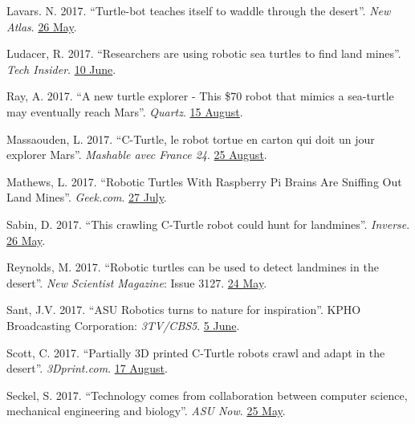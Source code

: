 \documentclass[12pt,a4paper]{article}
\begin{document}
\begin{description}
			\item Lavars. N. 2017. ``Turtle-bot teaches itself to waddle through the desert''. \textit{New Atlas}. \href{https://newatlas.com/turtle-robot-self-learning-waddle/49738/}{26 May}.
			\item Ludacer, R. 2017. ``Researchers are using robotic sea turtles to find land mines''. \textit{Tech Insider}. \href{https://www.facebook.com/techinsider/videos/787578874773804/}{10 June}.
			\item Ray, A. 2017. ``A new turtle explorer - This \$70 robot that mimics a sea-turtle may eventually reach Mars''. \textit{Quartz}. \href{https://qz.com/1053078/this-70-robot-that-mimics-a-sea-turtle-may-eventually-reach-mars/}{15 August}.
			\item Massaouden, L. 2017. ``C-Turtle, le robot tortue en carton qui doit un jour explorer Mars''. \textit{Mashable avec France 24}. \href{http://mashable.france24.com/videos/20170825-c-turtle-robot-tortue-carton-exploration-mars}{25 August}.
			\item Mathews, L. 2017. ``Robotic Turtles With Raspberry Pi Brains Are Sniffing Out Land Mines''. \textit{Geek.com}. \href{https://www.geek.com/tech/robotic-turtles-with-raspberry-pi-brains-are-sniffing-out-land-mines-1709339/}{27 July}.
			\item Sabin, D. 2017. ``This crawling C-Turtle robot could hunt for landmines''. \textit{Inverse}. \href{https://www.inverse.com/article/32219-cturtle-robot-sea-turtle-mines}{26 May}.
			\item Reynolds, M. 2017. ``Robotic turtles can be used to detect landmines in the desert''. \textit{New Scientist Magazine}: Issue 3127. \href{https://www.newscientist.com/article/mg23431274-200-robotic-turtles-can-be-used-to-detect-landmines-in-the-desert/}{24 May}.
			\item Sant, J.V. 2017. ``ASU Robotics turns to nature for inspiration''. KPHO Broadcasting Corporation: \textit{3TV/CBS5}. \href{http://www.azfamily.com/story/35595946/asu-robotics-turns-to-nature-for-inspiration}{5 June}.
			\item Scott, C. 2017. ``Partially 3D printed C-Turtle robots crawl and adapt in the desert''. \textit{3Dprint.com}. \href{https://3dprint.com/184523/3d-printed-c-turtle-robots/}{17 August}.
			\item Seckel, S. 2017. ``Technology comes from collaboration between computer science, mechanical engineering and biology''. \textit{ASU Now}. \href{https://asunow.asu.edu/20170525-solutions-asu-designed-c-turtle-robot-teaches-itself-get-around}{25 May}.

\end{description}
\end{document}
